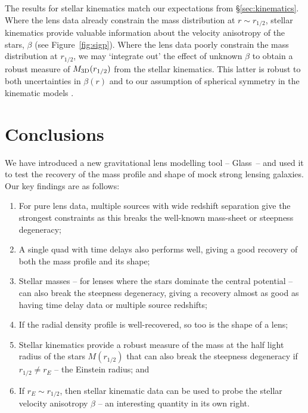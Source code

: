 \documentclass[galley,usenatbib]{mn2e}
\newcommand{\figref}[1] {Figure~\ref{#1}}
\begin{document}
The results for stellar kinematics match our expectations from
\S\ref{sec:kinematics}. Where the lens data already constrain the mass
distribution at $r \sim r_{1/2}$, stellar kinematics provide valuable
information about the velocity anisotropy of the stars, $\beta$ (see
\figref{fig:sigp}). Where the lens data poorly constrain the mass distribution
at $r_{1/2}$, we may `integrate out' the effect of unknown $\beta$ to obtain a
robust measure of $M_{\rm 3D}(r_{1/2})$ from the stellar kinematics. This latter is
robust to both uncertainties in $\beta(r)$ and to our assumption of spherical
symmetry in the kinematic models \citep{2012ApJ...754L..39A}.

\section{Conclusions}\label{sec:conclusions}

We have introduced a new gravitational lens modelling tool -- Glass\ -- and used
it to test the recovery of the mass profile and shape of mock strong lensing
galaxies. Our key findings are as follows: 

\begin{enumerate}
\item For pure lens data, multiple sources with wide redshift separation give the strongest
constraints as this breaks the well-known mass-sheet or steepness degeneracy;

\item A single quad with time delays also performs well, giving a good recovery
of both the mass profile and its shape; 

\item Stellar masses -- for lenses
where the stars dominate the central potential -- can also break the steepness
degeneracy, giving a recovery almost as good as having time delay data or
multiple source redshifts; 

\item If the radial density profile is well-recovered, so too is the shape of a lens; 

\item Stellar kinematics provide a robust measure of the mass at the half light radius of the stars $M(r_{1/2})$ that can also break the steepness degeneracy if $r_{1/2} \neq r_E$ -- the Einstein radius; and

\item If $r_E \sim r_{1/2}$, then stellar kinematic data can be used to probe the stellar velocity anisotropy 
$\beta$ -- an interesting quantity in its own right. 

\end{enumerate}
\end{document}
